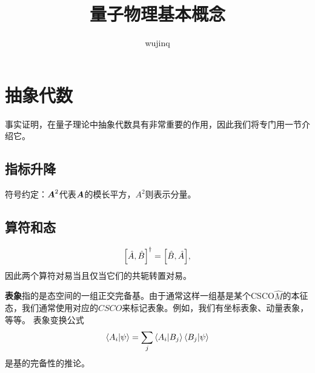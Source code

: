 \documentclass[UTF8, a4paper]{ctexart}
\title{量子物理基本概念}
\author{wujinq}
\begin{document}
\maketitle


\section{抽象代数}

事实证明，在量子理论中抽象代数具有非常重要的作用，因此我们将专门用一节介绍它。

\subsection{指标升降}

符号约定：$\vb*{A}^2$代表$\vb*{A}$的模长平方，$A^2$则表示分量。

\subsection{算符和态}

\[
    \comm{\hat{A}}{\hat{B}}^\dagger = \comm{\hat{B}}{\hat{A}},
\]
因此两个算符对易当且仅当它们的共轭转置对易。



\textbf{表象}指的是态空间的一组正交完备基。由于通常这样一组基是某个CSCO$\hat{M}$的本征态，我们通常使用对应的$CSCO$来标记表象。例如，我们有坐标表象、动量表象，等等。
表象变换公式
\begin{equation}
    \braket{A_i}{\psi} = \sum_j \braket{A_i}{B_j} \braket{B_j}{\psi}
\end{equation}
是基的完备性的推论。
\end{document}
